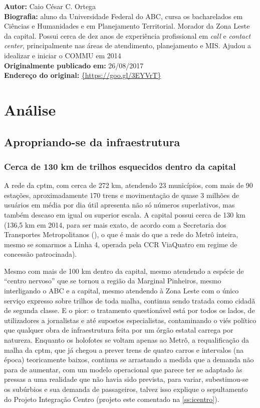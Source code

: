 \documentclass[11pt,fleqn]{book} %
\newcommand{\infocaio}[2]{\textbf{Autor:} Caio C\'{e}sar C. Ortega \\ \textbf{Biografia:} aluno da Universidade Federal do ABC, cursa os bacharelados em Ci\^{e}ncias e Humanidades e em Planejamento Territorial. Morador da Zona Leste da capital. Possui cerca de dez anos de experi\^{e}ncia profissional em \textit{call} e \textit{contact center}, principalmente nas \'{a}reas de atendimento, planejamento e MIS. Ajudou a idealizar e iniciar o COMMU em 2014 \\ \textbf{Originalmente publicado em:} {#1} \\ \textbf{Endere\c{c}o do original:} \url{{#2}}}
\begin{document}
\begin{info}
	\infocaio{26/08/2017}{https://goo.gl/3EYVrT}
\end{info}


\part{Análise}

\chapter{Apropriando-se da infraestrutura}

\section{Cerca de 130 km de trilhos esquecidos dentro da capital}

A rede da \gls{cptm}, com cerca de 272 km, atendendo 23 municípios, com mais de 90 estações, aproximadamente 170 trens e movimentação de quase 3 milhões de usuários em média por dia útil apresenta não só números superlativos, mas também descaso em igual ou superior escala. A capital possui cerca de 130 km (136,5 km em 2014, para ser mais exato, de acordo com a Secretaria dos Transportes Metropolitanos (\cite{gesp2014a}), o que é mais do que a rede do Metrô inteira, mesmo se somarmos a Linha 4, operada pela CCR ViaQuatro em regime de concessão patrocinada).

Mesmo com mais de 100 km dentro da capital, mesmo atendendo a espécie de “centro nervoso” que se tornou a região da Marginal Pinheiros, mesmo interligando o ABC e a capital, mesmo atendendo à Zona Leste com o único serviço expresso sobre trilhos de toda malha, continua sendo tratada como cidadã de segunda classe. E o pior: o tratamento questionável está por todos os lados, de utilizadores a jornalistas e até supostos especialistas, contaminando o viés político que qualquer obra de infraestrutura feita por um órgão estatal carrega por natureza. Enquanto os holofotes se voltam apenas ao Metrô, a requalificação da malha da \gls{cptm}, que já chegou a prever trens de quatro carros e intervalos (na época) teoricamente baixos, continua se arrastando a medida que a demanda não para de aumentar, com um modelo operacional que parece ter se adaptado às pressas a uma realidade que não havia sido prevista, para variar, subestimou-se os subúrbios e sua demanda de passageiros, talvez isso explique o sepultamento do Projeto Integração Centro (projeto este comentado na \autoref{ss:icentro}).
\end{document}
